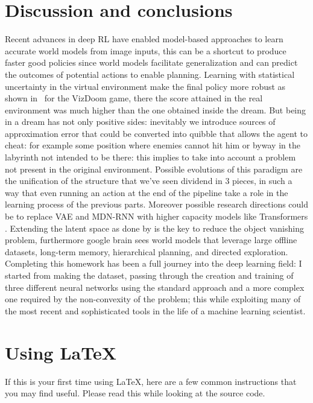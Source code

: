 \documentclass{article}
\begin{document}
\section{Discussion and conclusions}
Recent advances in deep RL have enabled model-based approaches 
to learn accurate world models from image inputs, this can be a shortcut to
produce faster good policies since world models facilitate generalization and can predict the outcomes of 
potential actions to enable planning. Learning with statistical uncertainty in the virtual environment make the final policy more robust
as shown in~\cite{wm} for the VizDoom game, there the score attained in the real environment was much higher than the one obtained inside the dream.
But being in a dream has not only positive sides: inevitably we introduce sources of approximation error
that could be converted into quibble that allows the agent to cheat: for example some position where enemies cannot hit him or
byway in the labyrinth not intended to be there: this implies to take into account a problem not present in the original environment.
Possible evolutions of this paradigm are the unification of the structure that we've seen dividend in 3 pieces, in such a way that even running an action at the end of the pipeline
take a role in the learning process of the previous parts. Moreover possible research directions could be
to replace VAE and MDN-RNN with higher capacity models like Transformers \cite{transformers}. Extending the latent space as done by \cite{dreamerv2} is the key to reduce the
object vanishing problem, furthermore google brain sees world models that leverage large offline datasets, long-term memory, hierarchical planning, and directed exploration.\\
Completing this homework has been a full journey into the deep learning field: 
I started from making the dataset, passing through the creation and training 
of three different neural networks using the standard approach and a more 
complex one required by the non-convexity of the problem; this while exploiting 
many of the most recent and sophisticated tools in the life of a machine learning scientist.

\section{Using \LaTeX}\label{sec:latex}

If this is your first time using \LaTeX, here are a few common instructions that you may find useful. Please read this while looking at the source code.
\end{document}
